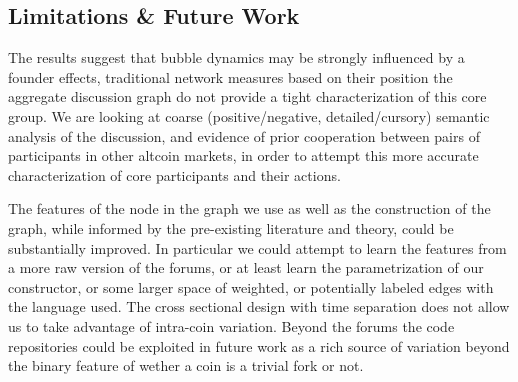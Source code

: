 \subsection{Limitations \& Future Work}

The results suggest that bubble dynamics may be strongly influenced by a founder effects, traditional network measures based on their position the aggregate discussion graph do not provide a tight characterization of this core group.
 We are looking at coarse (positive/negative, detailed/cursory) semantic analysis of the discussion, and evidence of prior cooperation between pairs of participants in other altcoin markets, in order to attempt this more accurate characterization of core participants and their actions.

The features of the node in the graph we use as well as the construction of the graph, while informed by the pre-existing literature and theory, could be substantially improved.
In particular we could attempt to learn the features from a more raw version of the forums, or at least learn the parametrization of our constructor, or some larger space of weighted, or potentially labeled edges with the language used.
The cross sectional design with time separation does not allow us to take advantage of intra-coin variation.
Beyond the forums the code repositories could be exploited in future work as a rich source of variation beyond the binary feature of wether a coin is a trivial fork or not.


